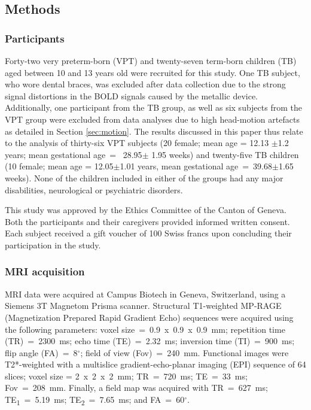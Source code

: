 \subsection{Methods}

\subsubsection{Participants}
Forty-two very preterm-born (VPT) and twenty-seven term-born children (TB) aged between 10 and 13 years old were recruited for this study. One TB subject, who wore dental braces, was excluded after data collection due to the strong signal distortions in the BOLD signals caused by the metallic device. Additionally, one participant from the TB group, as well as six subjects from the VPT group were excluded from data analyses due to high head-motion artefacts as detailed in Section \ref{sec:motion}. The results discussed in this paper thus relate to the analysis of thirty-six VPT subjects (20 female; mean age = 12.13 $\pm$1.2 years; mean gestational age~=~ 28.95$\pm$ 1.95 weeks) and twenty-five TB children (10 female; mean age = 12.05$\pm$1.01 years, mean gestational age~=~39.68$\pm$1.65 weeks). None of the children included in either of the groups had any major disabilities, neurological or psychiatric disorders.    

This study was approved by the Ethics Committee of the Canton of Geneva. Both the participants and their caregivers provided informed written consent. Each subject received a gift voucher of 100 Swiss francs upon concluding their participation in the study. 

\subsubsection{MRI acquisition}

MRI data were acquired at Campus Biotech in Geneva, Switzerland, using a Siemens 3T Magnetom Prisma scanner. Structural T1-weighted MP-RAGE (Magnetization Prepared Rapid Gradient Echo) sequences were acquired using the following parameters: voxel size~=~0.9~x~0.9~x~0.9~mm; repetition time (TR)~=~2300~ms; echo time (TE)~=~2.32~ms; inversion time (TI)~=~900~ms; flip angle (FA)~=~8$^{\circ}$; field of view (Fov)~=~240~mm. Functional images were T2*-weighted with a multislice gradient-echo-planar imaging (EPI) sequence of 64 slices; voxel size = 2~x~2~x~2~mm; TR~=~720~ms; TE~=~33~ms; Fov~=~208~mm. Finally, a field map was acquired with TR~=~627~ms; TE\textsubscript{1}~=~5.19~ms; TE\textsubscript{2}~=~7.65~ms; and FA~=~60$^{\circ}$.

